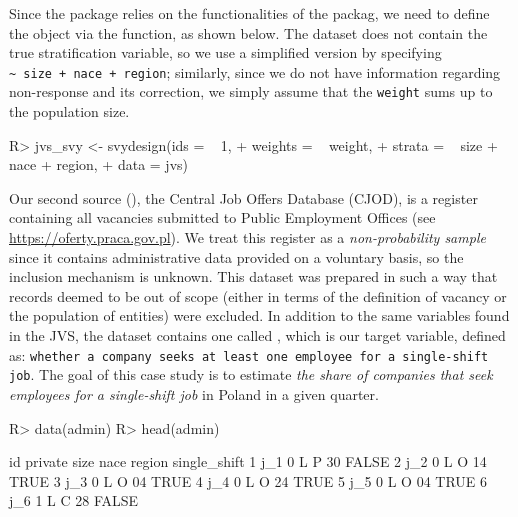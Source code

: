 \documentclass[
]{jss}
\begin{document}
Since the  package relies on the functionalities of the
 packag, we need to define the  object via
the  function, as shown below. The dataset does not
contain the true stratification variable, so we use a simplified version
by specifying \texttt{\textasciitilde{}\ size\ +\ nace\ +\ region};
similarly, since we do not have information regarding non-response and
its correction, we simply assume that the \texttt{weight} sums up to the
population size.

\begin{CodeChunk}
\begin{CodeInput}
R> jvs_svy <- svydesign(ids = ~ 1, 
+                      weights = ~ weight,
+                      strata = ~ size + nace + region,
+                      data = jvs)
\end{CodeInput}
\end{CodeChunk}

Our second source (), the Central Job Offers Database
(CJOD), is a register containing all vacancies submitted to Public
Employment Offices (see \url{https://oferty.praca.gov.pl}). We treat
this register as a \textit{non-probability sample} since it contains
administrative data provided on a voluntary basis, so the inclusion
mechanism is unknown. This dataset was prepared in such a way that
records deemed to be out of scope (either in terms of the definition of
vacancy or the population of entities) were excluded. In addition to the
same variables found in the JVS, the dataset contains one called
, which is our target variable, defined as:
\texttt{whether a company seeks at least one employee for a single-shift job}.
The goal of this case study is to estimate
\textit{the share of companies that seek employees for a single-shift job}
in Poland in a given quarter.

\begin{CodeChunk}
\begin{CodeInput}
R> data(admin)
R> head(admin)
\end{CodeInput}
\begin{CodeOutput}
   id private size nace region single_shift
1 j_1       0    L    P     30        FALSE
2 j_2       0    L    O     14         TRUE
3 j_3       0    L    O     04         TRUE
4 j_4       0    L    O     24         TRUE
5 j_5       0    L    O     04         TRUE
6 j_6       1    L    C     28        FALSE
\end{CodeOutput}
\end{CodeChunk}
\end{document}
